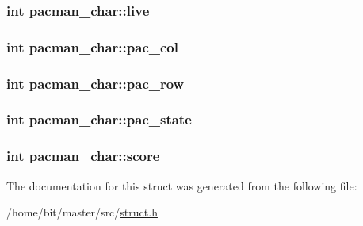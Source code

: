 \hypertarget{structpacman__char_a37a3feb51101b9a6c0bae26c2e80c9eb}{
\subsubsection[{live}]{\setlength{\rightskip}{0pt plus 5cm}int pacman\-\_\-char\-::live}}\label{structpacman__char_a37a3feb51101b9a6c0bae26c2e80c9eb}
\hypertarget{structpacman__char_aed55e8b8b665a7b0fa8b04b8c0555fbe}{
\subsubsection[{pac\-\_\-col}]{\setlength{\rightskip}{0pt plus 5cm}int pacman\-\_\-char\-::pac\-\_\-col}}\label{structpacman__char_aed55e8b8b665a7b0fa8b04b8c0555fbe}
\hypertarget{structpacman__char_a749edbe7d8d02c6bbce5d1a7ac6f9d0f}{
\subsubsection[{pac\-\_\-row}]{\setlength{\rightskip}{0pt plus 5cm}int pacman\-\_\-char\-::pac\-\_\-row}}\label{structpacman__char_a749edbe7d8d02c6bbce5d1a7ac6f9d0f}
\hypertarget{structpacman__char_a70880600ba726af6be3bfa3173db3e63}{
\subsubsection[{pac\-\_\-state}]{\setlength{\rightskip}{0pt plus 5cm}int pacman\-\_\-char\-::pac\-\_\-state}}\label{structpacman__char_a70880600ba726af6be3bfa3173db3e63}
\hypertarget{structpacman__char_ad5ec0d2c3024dcf105575a378bf701cb}{
\subsubsection[{score}]{\setlength{\rightskip}{0pt plus 5cm}int pacman\-\_\-char\-::score}}\label{structpacman__char_ad5ec0d2c3024dcf105575a378bf701cb}


The documentation for this struct was generated from the following file\-:\begin{DoxyCompactItemize}
\item 
/home/bit/master/src/\hyperlink{struct_8h}{struct.\-h}\end{DoxyCompactItemize}
